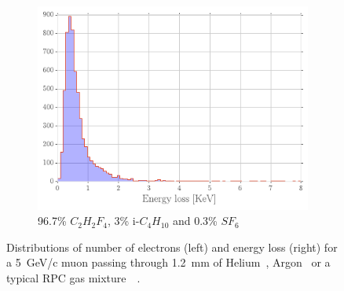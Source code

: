 \begin{figure}[H]
\begin{subfigure}{\linewidth}
			\includegraphics[width = 0.43\linewidth]{fig/chapt3/E_loss_RPC.pdf}
			\caption{\label{fig:Primary:C} 96.7\% $C_2H_2F_4$, 3\% i-$C_4H_{10}$ and 0.3\% $SF_6$~\cite{RIEGLER2003}}
		\end{subfigure}
		\caption{\label{fig:Primary} Distributions of number of electrons (left) and energy loss (right) for a \SI{5}{GeV/c} muon passing through \SI{1.2}{mm} of Helium~, Argon~ or a typical RPC gas mixture~~\cite{VINCENT2017}.}
	\end{figure}
	
